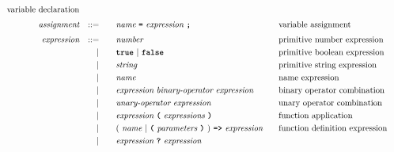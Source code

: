 \begin{alignat*}{9}
                                                            && \textrm{variable declaration}   \\[1mm]
&& \textit{assignment}   && ::= &\quad &&  \textit{name} \ 
                                           \textbf{\texttt{=}}\  \textit{expression} \ \textbf{\texttt{;}}
                                                            && \textrm{variable assignment}   \\[1mm]
&& \textit{expression}   && ::= &\quad &&  \textit{number}   && \textrm{primitive number expression}\\
&&                       && |   &\quad && \textbf{\texttt{true}}\ |\ \textbf{\texttt{false}}
                                                           && \textrm{primitive boolean expression}\\
&&                       && |   &\quad &&  \textit{string}   && \textrm{primitive string expression}\\
&&                       && |   &\quad &&  \textit{name}   && \textrm{name expression}\\
&&                       && |   &\quad &&  \textit{expression} \  \textit{binary-operator} \ 
                                            \textit{expression} \qquad
                                                           && \textrm{binary operator combination}\\
&&                       && |   &\quad &&   \textit{unary-operator} \ 
                                            \textit{expression}
                                                           && \textrm{unary operator combination}\\
&&                       && |   &\quad &&   \textit{expression} \ 
                                            \textbf{\texttt{(}}\ \textit{expressions}\
                                            \textbf{\texttt{)}}
                                                           && \textrm{function application}\\
&&                       && |   &\quad &&   (\ \textit{name}\ | \
                                               \textbf{\texttt{(}}\ \textit{parameters}\ \textbf{\texttt{)}}\
                                            )\    
                                            \texttt{\textbf{=>}}\ \textit{expression}
                                                           && \textrm{function definition expression}\\
&&                       && |   &\quad &&   \textit{expression} \ \textbf{\texttt{?}}\ 
                                            \textit{expression}

\end{alignat*}
